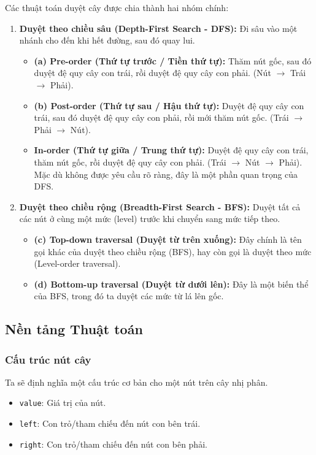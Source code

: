 \documentclass[a4paper,12pt]{article}
\begin{document}
Các thuật toán duyệt cây được chia thành hai nhóm chính:
\begin{enumerate}
    \item \textbf{Duyệt theo chiều sâu (Depth-First Search - DFS):} Đi sâu vào một nhánh cho đến khi hết đường, sau đó quay lui.
    \begin{itemize}
        \item \textbf{(a) Pre-order (Thứ tự trước / Tiền thứ tự):} Thăm nút gốc, sau đó duyệt đệ quy cây con trái, rồi duyệt đệ quy cây con phải. (Nút $\to$ Trái $\to$ Phải).
        \item \textbf{(b) Post-order (Thứ tự sau / Hậu thứ tự):} Duyệt đệ quy cây con trái, sau đó duyệt đệ quy cây con phải, rồi mới thăm nút gốc. (Trái $\to$ Phải $\to$ Nút).
        \item \textbf{In-order (Thứ tự giữa / Trung thứ tự):} Duyệt đệ quy cây con trái, thăm nút gốc, rồi duyệt đệ quy cây con phải. (Trái $\to$ Nút $\to$ Phải). Mặc dù không được yêu cầu rõ ràng, đây là một phần quan trọng của DFS.
    \end{itemize}
    \item \textbf{Duyệt theo chiều rộng (Breadth-First Search - BFS):} Duyệt tất cả các nút ở cùng một mức (level) trước khi chuyển sang mức tiếp theo.
    \begin{itemize}
        \item \textbf{(c) Top-down traversal (Duyệt từ trên xuống):} Đây chính là tên gọi khác của duyệt theo chiều rộng (BFS), hay còn gọi là duyệt theo mức (Level-order traversal).
        \item \textbf{(d) Bottom-up traversal (Duyệt từ dưới lên):} Đây là một biến thể của BFS, trong đó ta duyệt các mức từ lá lên gốc.
    \end{itemize}
\end{enumerate}

\subsection{Nền tảng Thuật toán}

\subsubsection{Cấu trúc nút cây}
Ta sẽ định nghĩa một cấu trúc cơ bản cho một nút trên cây nhị phân.
\begin{itemize}
    \item \texttt{value}: Giá trị của nút.
    \item \texttt{left}: Con trỏ/tham chiếu đến nút con bên trái.
    \item \texttt{right}: Con trỏ/tham chiếu đến nút con bên phải.
\end{itemize}
\end{document}
